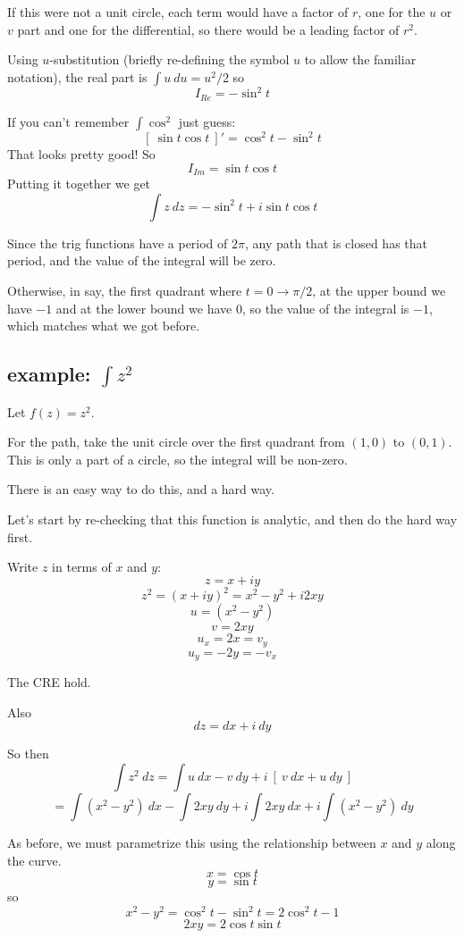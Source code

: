 \documentclass[11pt, oneside]{article}
\begin{document}
If this were not a unit circle, each term would have a factor of $r$, one for the $u$ or $v$ part and one for the differential, so there would be a leading factor of $r^2$.

Using $u$-substitution (briefly re-defining the symbol $u$ to allow the familiar notation), the real part is $\int u \ du = u^2/2$ so
\[ I_{Re} = - \sin^2 t \]

If you can't remember $\int \cos^2$ just guess:
\[ [ \ \sin t \cos t \ ]' = \cos^2 t - \sin^2 t \]
That looks pretty good!  So
\[ I_{Im} = \sin t \cos t \]
Putting it together we get
\[ \int z \ dz = - \sin^2 t + i \sin t \cos t \]

Since the trig functions have a period of $2 \pi$, any path that is closed has that period, and the value of the integral will be zero.

Otherwise, in say, the first quadrant where $t = 0 \rightarrow \pi/2$, at the upper bound we have $-1$ and at the lower bound we have $0$, so the value of the integral is $-1$, which matches what we got before.

\subsection*{example:  $\int z^2$}
Let $f(z) = z^2$.  

For the path, take the unit circle over the first quadrant from $(1,0)$ to $(0,1)$.  This is only a part of a circle, so the integral will be non-zero. 

There is an easy way to do this, and a hard way.  

Let's start by re-checking that this function is analytic, and then do the hard way first.

Write $z$ in terms of $x$ and $y$:
\[ z = x + iy \]
\[ z^2 = (x + iy)^2 = x^2 - y^2 + i2xy \]
\[ u = (x^2 - y^2) \]
\[ v = 2xy \]
\[ u_x = 2x = v_y \]
\[ u_y = -2y = -v_x \]

The CRE hold.

Also
\[ dz = dx + i \ dy \]

So then
\[ \int z^2 \ dz = \int u \ dx - v \ dy + i \ [ \ v \ dx + u \ dy \ ] \]
\[ = \int (x^2 - y^2) \ dx - \int 2 xy \ dy + i \int 2xy \ dx + i \int (x^2-y^2) \ dy \]

As before, we must parametrize this using the relationship between $x$ and $y$ along the curve.
\[ x = \cos t \]
\[ y = \sin t \]
so
\[ x^2 - y^2 = \cos^2 t - \sin^2 t = 2 \cos^2 t - 1  \]
\[ 2xy = 2 \cos t \sin t  \]
\end{document}
